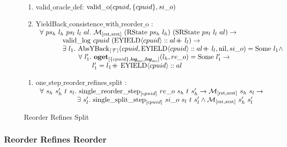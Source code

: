 \begin{figure}
\begin{enumerate}
\item valid$\_$oracle$\_$def: ${\mathrm{valid}\_\mathrm{o}}({cpuid}, {\{cpuid\}}, {si\_o })$
\item YieldBack$\_$consistence$\_$with$\_$reorder$\_$o :\\
$
\begin{array}{l}
\forall \ ps_h \ l_h \ ps_l \ l_l \ al.\ \matchrstatesrstate{(\rstate{ps_h}{l_h})}{(\srstate{ps_l}{l_l}{al})} \rightarrow \\
\ \ \ \ \ \ \ \ \ \ \validlog{cpuid}{(\listcons{\yieldev{cpuid}}{\listapp{al}{l_l}})} \rightarrow \\
\ \ \ \ \ \ \ \ \ \ \exists\ l_1. \ \yieldbackfunc{\timebound}{cpuid}{\listcons{\yieldev{cpuid}}{\listapp{al}{l_l}}}{\nulllist}{si\_o}{l_1} \wedge \\ 
\ \ \ \ \ \ \ \ \ \ \ \ \ \ \ \ \ \forall \ l_1' .\  \oget{\set{cpuid}}{\mclog}{\mclog}{l_h}{re\_o}{l_1'} \rightarrow \\ 
\ \ \ \ \ \ \ \ \ \ \ \ \ \ \ \ \  \ \ \ \ \ \ l_1' = \listapp{l_1}{\listcons{\yieldev{cpuid}}{al}} \\
\end{array}
$
\end{enumerate}



\begin{enumerate}
\item one$\_$step$\_$reorder$\_$refines$\_$split : \\
$
\begin{array}{l}
\forall \ s_h \ s_h' \ t \ s_l . \ \singlereorderstep{cpuid}{re\_o}{s_h}{t}{s_h'} \rightarrow  \matchrstatesrstate{s_h}{s_l} \rightarrow \\
\ \ \ \ \ \ \ \ \ \ \ \ \ \ \ \ \exists\ s_l' .\ \singlesplitstep{cpuid}{si\_o}{s_l}{t}{s_l'} \wedge  \matchrstatesrstate{s_h'}{s_l'}\\
\end{array}
$
\end{enumerate}

\caption{Reorder Refines Split}
\label{fig:reorder-refines-split}
\end{figure}


\clearpage

\subsubsection{Reorder Refines Reorder}
\label{subsubsec:reorder-refines-reorder}



